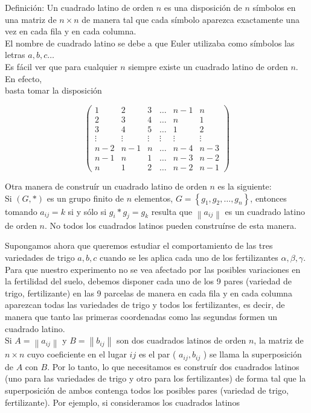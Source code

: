 \documentclass[10pt]{article}
\begin{document}
Definición: Un cuadrado latino de orden $n$ es una disposición de $n$ símbolos en una matriz de $n \times n$ de manera tal que cada símbolo aparezca exactamente una vez en cada fila y en cada columna.\\
El nombre de cuadrado latino se debe a que Euler utilizaba como símbolos las letras $a, b, c \ldots$\\
Es fácil ver que para cualquier $n$ siempre existe un cuadrado latino de orden $n$. En efecto,\\
basta tomar la disposición

$$
\left(\begin{array}{cccccc}
1 & 2 & 3 & \ldots & n-1 & n \\
2 & 3 & 4 & \ldots & n & 1 \\
3 & 4 & 5 & \ldots & 1 & 2 \\
\vdots & \vdots & \vdots & \vdots & \vdots & \vdots \\
n-2 & n-1 & n & \ldots & n-4 & n-3 \\
n-1 & n & 1 & \ldots & n-3 & n-2 \\
n & 1 & 2 & \ldots & n-2 & n-1
\end{array}\right)
$$

Otra manera de construír un cuadrado latino de orden $n$ es la siguiente:\\
Si $(G, *)$ es un grupo finito de $n$ elementos, $G=\left\{g_{1}, g_{2}, \ldots, g_{n}\right\}$, entonces tomando $a_{i j}=k$ si y sólo si $g_{i} * g_{j}=g_{k}$ resulta que $\left\|a_{i j}\right\|$ es un cuadrado latino de orden $n$. No todos los cuadrados latinos pueden construírse de esta manera.

Supongamos ahora que queremos estudiar el comportamiento de las tres variedades de trigo $a, b, c$ cuando se les aplica cada uno de los fertilizantes $\alpha, \beta, \gamma$. Para que nuestro experimento no se vea afectado por las posibles variaciones en la fertilidad del suelo, debemos disponer cada uno de los 9 pares (variedad de trigo, fertilizante) en las 9 parcelas de manera en cada fila y en cada columna aparezcan todas las variedades de trigo y todos los fertilizantes, es decir, de manera que tanto las primeras coordenadas como las segundas formen un cuadrado latino.\\
Si $A=\left\|a_{i j}\right\|$ y $B=\left\|b_{i j}\right\|$ son dos cuadrados latinos de orden $n$, la matriz de $n \times n$ cuyo coeficiente en el lugar $i j$ es el par ( $a_{i j}, b_{i j}$ ) se llama la superposición de $A$ con $B$. Por lo tanto, lo que necesitamos es construír dos cuadrados latinos (uno para las variedades de trigo y otro para los fertilizantes) de forma tal que la superposición de ambos contenga todos los posibles pares (variedad de trigo, fertilizante). Por ejemplo, si consideramos los cuadrados latinos
\end{document}
